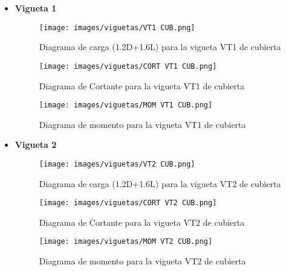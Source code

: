 \begin{itemize}
    \item \textbf{Vigueta 1}\\
    \begin{figure}[H]
                \centering
                \texttt{[image: images/viguetas/VT1 CUB.png]} 
                \caption{Diagrama de carga (1.2D+1.6L) para la vigueta VT1 de cubierta}
                \label{fig:W VT1 CUB}
            \end{figure}
            
            \begin{figure}[H]
                \centering
                \texttt{[image: images/viguetas/CORT VT1 CUB.png]}
                \caption{Diagrama de Cortante para la vigueta VT1 de cubierta}
                \label{fig:v VT7 CUB}
            \end{figure}
            
             \begin{figure}[H]
                \centering
                \texttt{[image: images/viguetas/MOM VT1 CUB.png]} 
                \caption{Diagrama de momento para la vigueta VT1 de cubierta}
                \label{fig:M VT1 CUB}
            \end{figure}
        
        \item \textbf{Vigueta 2}\\
        \begin{figure}[H]
                \centering
                \texttt{[image: images/viguetas/VT2 CUB.png]} 
                \caption{Diagrama de carga (1.2D+1.6L) para la vigueta VT2 de cubierta}
                \label{fig:W VT2 CUB}
            \end{figure}
            
            \begin{figure}[H]
                \centering
                \texttt{[image: images/viguetas/CORT VT2 CUB.png]}
                \caption{Diagrama de Cortante para la vigueta VT2 de cubierta}
                \label{fig:v VT2 CUB}
            \end{figure}
            
             \begin{figure}[H]
                \centering
                \texttt{[image: images/viguetas/MOM VT2 CUB.png]} 
                \caption{Diagrama de momento para la vigueta VT2 de cubierta}
                \label{fig:M VT2 CUB}
            \end{figure}
            

\end{itemize}
